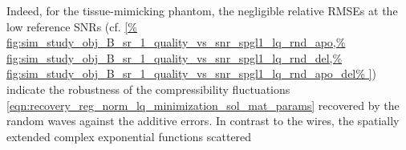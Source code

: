 Indeed, for
the tissue-mimicking phantom,
the negligible relative \acp{RMSE} at
the low reference \acp{SNR}
(cf. \cref{%
  fig:sim_study_obj_B_sr_1_quality_vs_snr_spgl1_lq_rnd_apo,%
  fig:sim_study_obj_B_sr_1_quality_vs_snr_spgl1_lq_rnd_del,%
  fig:sim_study_obj_B_sr_1_quality_vs_snr_spgl1_lq_rnd_apo_del%
}) indicate
the robustness of
the compressibility fluctuations
\eqref{eqn:recovery_reg_norm_lq_minimization_sol_mat_params} recovered by
the random waves against
the additive errors.
In contrast to
the wires,
the spatially extended complex exponential functions scattered
